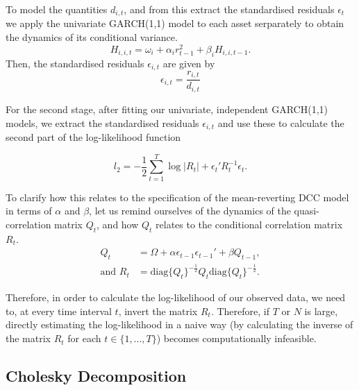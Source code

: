 \documentclass{article} %
\numberwithin{equation}{section} %
\numberwithin{figure}{section} %
\numberwithin{table}{section} %
\begin{document}
To model the quantities $d_{i,t}$, and from this extract the standardised residuals $\epsilon_t$ we apply the univariate GARCH(1,1) model to each asset serparately to obtain the dynamics of its conditional variance.
\begin{equation}\label{eq: garch}
  H_{i,i,t} = \omega_i + \alpha_i r_{t-1}^2 + \beta_i H_{i,i,t-1}.
\end{equation}
 Then, the standardised residuals $\epsilon _{i,t}$ are given by
 \begin{equation}
\epsilon_{i,t} = \frac{r_{i,t}}{d_{i,t}}
 \end{equation}

For the second stage, after fitting our univariate, independent GARCH(1,1) models, we extract the standardised residuals $\epsilon_{i,t}$ and use these to calculate the second part of the log-likelihood function

\begin{equation}\label{eq: L2}
l_2 = -\frac{1}{2}\sum\limits_{t=1}^{T} \log |R_t| + \epsilon_t'R_t^{-1}\epsilon_t.
\end{equation}

To clarify how this relates to the specification of the mean-reverting DCC model in terms of $\alpha$ and $\beta$, let us remind ourselves of the dynamics of the quasi-correlation matrix $Q_t$, and how $Q_t$ relates to the conditional correlation matrix $R_t$.
\begin{align}
Q_t
&= \Omega + \alpha \epsilon_{t-1}\epsilon_{t-1}' + \beta Q_{t-1}, \\
\text{and } R_t
&= \text{diag}\{Q_t\}^{-\frac{1}{2}} Q_t \text{diag}\{Q_t\}^{-\frac{1}{2}}.
\end{align}

Therefore, in order to calculate the log-likelihood of our observed data, we need to, at every time interval $t$, invert the matrix $R_t$. Therefore, if $T$ or $N$ is large, directly estimating the log-likelihood in a naive way (by calculating the inverse of the matrix $R_t$ for each $t \in \{1, \ldots , T\}$) becomes computationally infeasible.

\subsection{Cholesky Decomposition}
\end{document}
